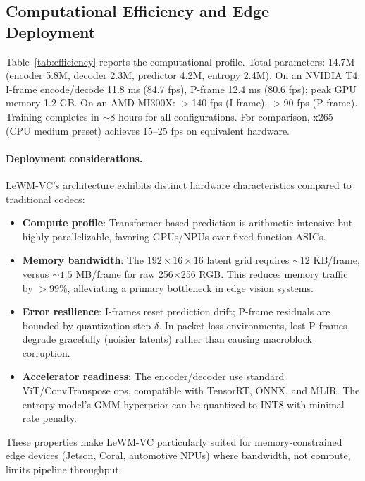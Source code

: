 \documentclass{article}
\begin{document}
\subsection{Computational Efficiency and Edge Deployment}
\label{sec:efficiency}

Table~\ref{tab:efficiency} reports the computational profile. Total parameters: 14.7M (encoder 5.8M, decoder 2.3M, predictor 4.2M, entropy 2.4M). On an NVIDIA T4: I-frame encode/decode 11.8 ms (84.7 fps), P-frame 12.4 ms (80.6 fps); peak GPU memory 1.2 GB. On an AMD MI300X: $>$140 fps (I-frame), $>$90 fps (P-frame). Training completes in ${\sim}$8 hours for all configurations. For comparison, x265 (CPU medium preset) achieves 15--25 fps on equivalent hardware.

\paragraph{Deployment considerations.}
LeWM-VC's architecture exhibits distinct hardware characteristics compared to traditional codecs:
\begin{itemize}
    \item \textbf{Compute profile}: Transformer-based prediction is arithmetic-intensive but highly parallelizable, favoring GPUs/NPUs over fixed-function ASICs.
    \item \textbf{Memory bandwidth}: The $192{\times}16{\times}16$ latent grid requires ${\sim}12$ KB/frame, versus ${\sim}1.5$ MB/frame for raw 256$\times$256 RGB. This reduces memory traffic by $>99\%$, alleviating a primary bottleneck in edge vision systems.
    \item \textbf{Error resilience}: I-frames reset prediction drift; P-frame residuals are bounded by quantization step $\delta$. In packet-loss environments, lost P-frames degrade gracefully (noisier latents) rather than causing macroblock corruption.
    \item \textbf{Accelerator readiness}: The encoder/decoder use standard ViT/ConvTranspose ops, compatible with TensorRT, ONNX, and MLIR. The entropy model's GMM hyperprior can be quantized to INT8 with minimal rate penalty.
\end{itemize}
These properties make LeWM-VC particularly suited for memory-constrained edge devices (Jetson, Coral, automotive NPUs) where bandwidth, not compute, limits pipeline throughput.
\end{document}
